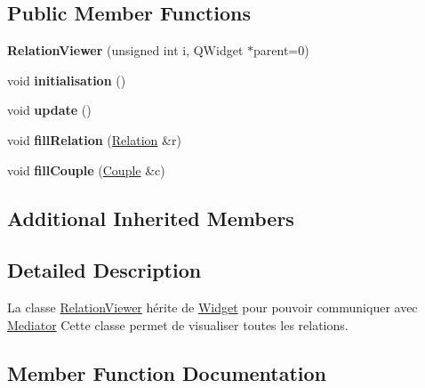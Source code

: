 \subsection*{Public Member Functions}
\begin{DoxyCompactItemize}
\item 
\mbox{\label{classRelationViewer_ad3be69ff8a6363a5bd929ad97ea4bc21}} 
{\bfseries Relation\+Viewer} (unsigned int i, Q\+Widget $\ast$parent=0)
\item 
\mbox{\label{classRelationViewer_a33eeeabaf7997a37990c4174ac9b421c}} 
void {\bfseries initialisation} ()
\item 
\mbox{\label{classRelationViewer_a264358e294cd4b94f5061f5aed79c856}} 
void {\bfseries update} ()
\item 
\mbox{\label{classRelationViewer_a236974b7e44ea4c67da7794812623194}} 
void {\bfseries fill\+Relation} (\hyperlink{classRelation}{Relation} \&r)
\item 
\mbox{\label{classRelationViewer_aa3923d489adae30c57fd94b64ced8924}} 
void {\bfseries fill\+Couple} (\hyperlink{classCouple}{Couple} \&c)
\end{DoxyCompactItemize}
\subsection*{Additional Inherited Members}


\subsection{Detailed Description}
La classe \hyperlink{classRelationViewer}{Relation\+Viewer} hérite de \hyperlink{classWidget}{Widget} pour pouvoir communiquer avec \hyperlink{classMediator}{Mediator} Cette classe permet de visualiser toutes les relations. 

\subsection{Member Function Documentation}
\mbox{\label{classRelationViewer_ad0771f0bf9198b53ad8e0d77b4425e93}} 

